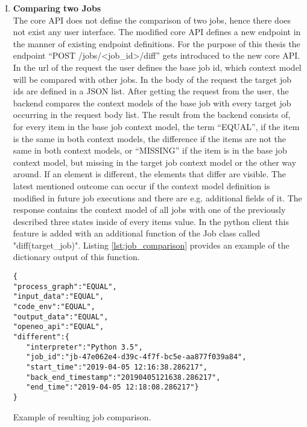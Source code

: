 \documentclass[draft,final]{vutinfth} %
\begin{document}
\begin{enumerate}[I.]
\item \textbf{Comparing two Jobs} \\
	The core API does not define the comparison of two jobs, hence there does not exist any user interface. The modified core API defines a new endpoint in the manner of existing endpoint definitions. For the purpose of this thesis the endpoint  “POST /jobs/<job\_id>/diff” gets introduced to the new core API. In the url of the request the user defines the base job id, which context model will be compared with other jobs. In the body of the request the target job ids are defined in a JSON list. After getting the request from the user, the backend compares the context models of the base job with every target job occurring in the request body list. The result from the backend consists of, for every item in the base job context model, the term “EQUAL”, if the item is the same in both context models, the difference if the items are not the same in both context models, or “MISSING” if the item is in the base job context model, but missing in the target job context model or the other way around. If an element is different, the elements that differ are visible. The latest mentioned outcome can occur if the context model definition is modified in future job executions and there are e.g. additional fields of it. The response contains the context model of all jobs with one of the previously described three states inside of every items value. In the python client this feature is added with an additional function of the Job class called "diff(target\_job)". Listing \ref{lst:job_comparison} provides an example of the dictionary output of this function.

\begin{listing}[ht]
	\begin{verbatim}
{
"process_graph":"EQUAL",
"input_data":"EQUAL",
"code_env":"EQUAL",
"output_data":"EQUAL",
"openeo_api":"EQUAL",
"different":{
   "interpreter":"Python 3.5",
   "job_id":"jb-47e062e4-d39c-4f7f-bc5e-aa877f039a84",
   "start_time":"2019-04-05 12:16:38.286217",
   "back_end_timestamp":"20190405121638.286217",
   "end_time":"2019-04-05 12:18:08.286217"}
}
	\end{verbatim}
	\caption{Example of resulting job comparison.}
	\label{lst:job_comparison}
\end{listing}	



\end{enumerate}
\end{document}
